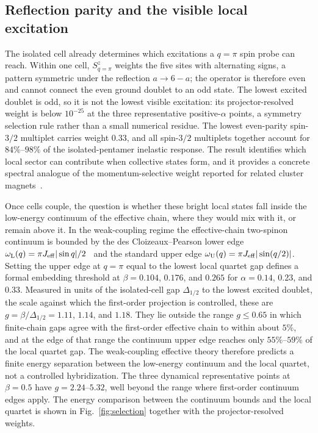 \subsection{Reflection parity and the visible local excitation}
\label{sec:parity}

The isolated cell already determines which excitations a $q=\pi$ spin probe can
reach.
Within one cell, $S^z_{q=\pi}$ weights the five sites with alternating signs, a
pattern symmetric under the reflection $a\to6-a$; the operator is therefore even
and cannot connect the even ground doublet to an odd state.
The lowest excited doublet is odd, so it is not the lowest visible excitation:
its projector-resolved weight is below $10^{-25}$ at the three representative
positive-$\alpha$ points, a symmetry selection rule rather than a small numerical
residue.
The lowest even-parity spin-$3/2$ multiplet carries weight $0.33$, and
all spin-$3/2$ multiplets together account for $84\%$--$98\%$ of the
isolated-pentamer inelastic response.
The result identifies which local sector can contribute when collective states
form, and it provides a concrete spectral analogue of the
momentum-selective weight reported for related cluster
magnets~\cite{gao2024srv3o9,schlappa2018}.

Once cells couple, the question is whether these bright local states fall inside
the low-energy continuum of the effective chain, where they would mix with it, or
remain above it.
In the weak-coupling regime the effective-chain two-spinon continuum is bounded by the des Cloizeaux--Pearson lower edge
$\omega_{\mathrm L}(q)=\pi J_{\mathrm{eff}}|\sin q|/2$~\cite{descloizeaux1962} and the
standard upper edge $\omega_{\mathrm U}(q)=\pi J_{\mathrm{eff}}|\sin(q/2)|$.
Setting the upper edge at $q=\pi$ equal to the lowest local quartet gap defines a
formal embedding threshold at $\beta=0.104$, $0.176$, and $0.265$ for
$\alpha=0.14$, 0.23, and 0.33.
Measured in units of the isolated-cell gap $\Delta_{1/2}$ to the lowest excited
doublet, the scale against which the first-order projection is controlled, these
are $g=\beta/\Delta_{1/2}=1.11$, $1.14$, and $1.18$.
They lie outside the range $g\le0.65$ in which finite-chain gaps agree with the
first-order effective chain to within about $5\%$, and at the edge of that
range the continuum upper edge reaches only $55\%$--$59\%$ of the local
quartet gap.
The weak-coupling effective theory therefore predicts a finite energy separation
between the low-energy continuum and the local quartet, not a controlled
hybridization.
The three dynamical representative points at $\beta=0.5$ have $g=2.24$--$5.32$,
well beyond the range where first-order continuum edges apply.
The energy comparison between the continuum bounds and the local quartet is shown
in Fig.~\ref{fig:selection} together with the projector-resolved weights.

